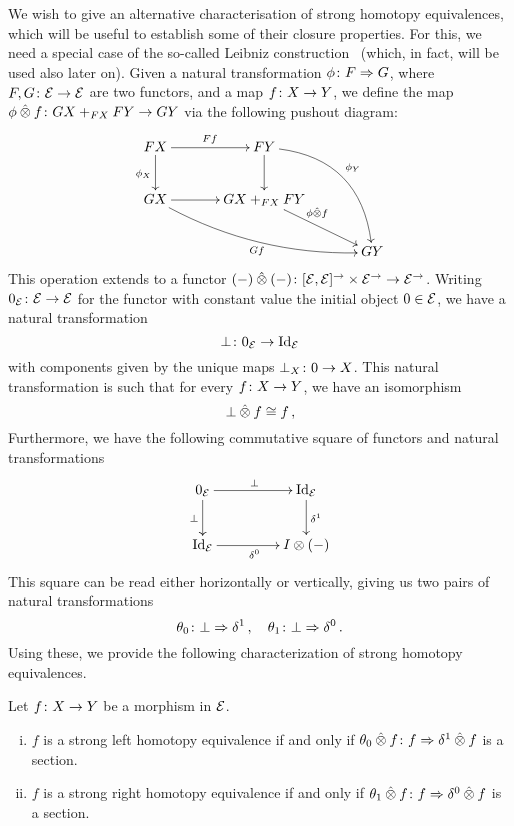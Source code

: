 \documentclass[reqno,10pt,a4paper,oneside]{amsart}
\begin{document}
We wish to give an alternative characterisation of strong homotopy equivalences, which will be useful to establish some of their closure properties. For this,
we need a special case of the so-called Leibniz construction~\cite{riehl-verity:reedy} (which, in fact, will be used also later on). Given a natural transformation $\phi \colon F \Rightarrow
G$, where $F, G \colon \mathcal{E} \to \mathcal{E}$ are two functors, and a map $f \colon X \to Y$, we define the map~$\phi \mathbin{\hat{\otimes}} f \colon GX +_{FX} FY \to GY$ via the following
pushout diagram:
 \[
\xymatrix@C=1.2cm{
FX \ar[r]^{Ff}  \ar[d]_{\phi_X} & FY  \ar@/^2pc/[ddr]^{\phi_Y} \ar[d] & \\ 
GX \ar@/_1pc/[drr]_{Gf} \ar[r] &  GX +_{FX} FY \ar[dr]^-(.35){\phi \hatotimes f}  & \\ 
 & & GY } 
 \]
This operation extends to a functor $(-) \mathbin{\hat{\otimes}} (-) \colon [\mathcal{E}, \mathcal{E}]^\to \times \mathcal{E}^\to \to \mathcal{E}^\to$. Writing $0_{\mathcal{E}} \colon \mathcal{E} \to \mathcal{E}$ for the
functor with constant value the initial object $0 \in \mathcal{E}$, we have a natural transformation 
\[
\bot \colon 0_{\mathcal{E}} \to \operatorname{Id}_{\mathcal{E}}
\]
with components given by  the unique maps $\bot_X \colon 0 \to X$. This natural transformation is such that for every $f \colon X \to Y$, we have 
an isomorphism
\[
 \bot \mathbin{\hat{\otimes}} f \cong f  \, ,
\]
Furthermore, we have the following commutative square of functors and natural transformations
\begin{equation}
\label{trivial-square}
\begin{gathered}
\xymatrix@C+2em{
  0_\catE
  \ar[r]^{\bot}
  \ar[d]_{\bot}
&
  \Id_\catE
  \ar[d]^{\rcyl}
\\
  \Id_\catE  \ar[r]_{\lcyl}
&
  \interval \otimes (-) 
}
\end{gathered}
\end{equation}
This square can be read either horizontally or vertically, giving us two pairs of natural transformations
\[
\theta_{0} \colon \bot \Rightarrow \delta^1  \, , \quad \theta_{1} \colon \bot \Rightarrow \delta^0 \,. 
\]
Using these, we provide the following  characterization of strong homotopy equivalences.

\begin{proposition}
\label{strong-h-equiv-as-section}
Let $f \colon X  \to Y$ be a morphism in $\mathcal{E}$.
\begin{enumerate}[(i)]
\item $f$ is a strong left homotopy equivalence if and only if $\theta_{0} \mathbin{\hat{\otimes}} f \colon f \Rightarrow \delta^1 \mathbin{\hat{\otimes}} f$ is a section.
\item $f$ is a strong right homotopy equivalence if and only if $\theta_{1} \mathbin{\hat{\otimes}} f \colon f \Rightarrow  \delta^0 \mathbin{\hat{\otimes}} f$ is a section.
\end{enumerate}
\end{proposition}
\end{document}
